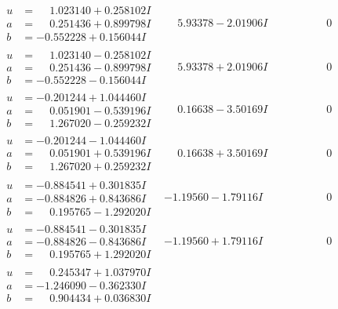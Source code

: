 \documentclass[1p]{elsarticle_modified}
\theoremstyle{definition}
\begin{document}
$$\begin{array}{c|c|c}
\begin{aligned}
u &= \phantom{-}1.023140 + 0.258102 I \\
a &= \phantom{-}0.251436 + 0.899798 I \\
b &= -0.552228 + 0.156044 I\end{aligned}
 & \phantom{-}5.93378 - 2.01906 I & \phantom{-0.000000 } 0 \\ \hline\begin{aligned}
u &= \phantom{-}1.023140 - 0.258102 I \\
a &= \phantom{-}0.251436 - 0.899798 I \\
b &= -0.552228 - 0.156044 I\end{aligned}
 & \phantom{-}5.93378 + 2.01906 I & \phantom{-0.000000 } 0 \\ \hline\begin{aligned}
u &= -0.201244 + 1.044460 I \\
a &= \phantom{-}0.051901 - 0.539196 I \\
b &= \phantom{-}1.267020 - 0.259232 I\end{aligned}
 & \phantom{-}0.16638 - 3.50169 I & \phantom{-0.000000 } 0 \\ \hline\begin{aligned}
u &= -0.201244 - 1.044460 I \\
a &= \phantom{-}0.051901 + 0.539196 I \\
b &= \phantom{-}1.267020 + 0.259232 I\end{aligned}
 & \phantom{-}0.16638 + 3.50169 I & \phantom{-0.000000 } 0 \\ \hline\begin{aligned}
u &= -0.884541 + 0.301835 I \\
a &= -0.884826 + 0.843686 I \\
b &= \phantom{-}0.195765 - 1.292020 I\end{aligned}
 & -1.19560 - 1.79116 I & \phantom{-0.000000 } 0 \\ \hline\begin{aligned}
u &= -0.884541 - 0.301835 I \\
a &= -0.884826 - 0.843686 I \\
b &= \phantom{-}0.195765 + 1.292020 I\end{aligned}
 & -1.19560 + 1.79116 I & \phantom{-0.000000 } 0 \\ \hline\begin{aligned}
u &= \phantom{-}0.245347 + 1.037970 I \\
a &= -1.246090 - 0.362330 I \\
b &= \phantom{-}0.904434 + 0.036830 I\end{aligned}

\end{array}$$
\end{document}
